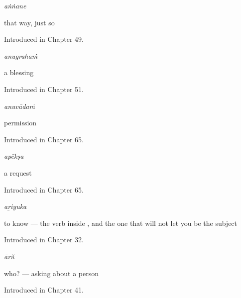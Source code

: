 \noindent\begin{minipage}[t]{\linewidth}
\raggedright
\textbf{}\enspace\emph{aṅṅane}\par
\small that way, just so\par
\footnotesize Introduced in Chapter 49.
\end{minipage}\par\medskip

\noindent\begin{minipage}[t]{\linewidth}
\raggedright
\textbf{}\enspace\emph{anugrahaṁ}\par
\small a blessing\par
\footnotesize Introduced in Chapter 51.
\end{minipage}\par\medskip

\noindent\begin{minipage}[t]{\linewidth}
\raggedright
\textbf{}\enspace\emph{anuvādaṁ}\par
\small permission\par
\footnotesize Introduced in Chapter 65.
\end{minipage}\par\medskip

\noindent\begin{minipage}[t]{\linewidth}
\raggedright
\textbf{}\enspace\emph{apēkṣa}\par
\small a request\par
\footnotesize Introduced in Chapter 65.
\end{minipage}\par\medskip

\noindent\begin{minipage}[t]{\linewidth}
\raggedright
\textbf{}\enspace\emph{aṟiyuka}\par
\small to know — the verb inside   , and the one that will not let you be the subject\par
\footnotesize Introduced in Chapter 32.
\end{minipage}\par\medskip

\noindent\begin{minipage}[t]{\linewidth}
\raggedright
\textbf{}\enspace\emph{ārŭ}\par
\small who? — asking about a person\par
\footnotesize Introduced in Chapter 41.
\end{minipage}\par\medskip

